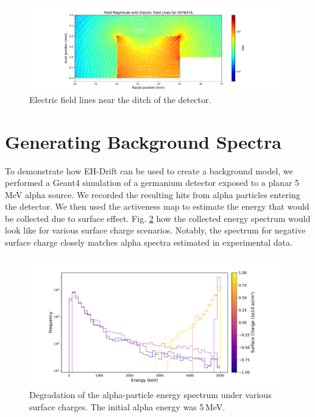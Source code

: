 \begin{figure}
\includegraphics[trim={5cm 0cm 5cm 0cm},clip,width=0.99\linewidth]{ch5/figs/elect_field_lines_surface_V07647A.pdf}
\caption{Electric field lines near the ditch of the detector.}
\label{ch5:fig:elect_field_lines_surface_V07647A}
\end{figure}
\section{\label{res:3} Generating Background Spectra}

To demonstrate how EH-Drift can be used to create a background model, we performed a Geant4 simulation of a germanium detector exposed to a planar 5\,MeV alpha source. We recorded the resulting hits from alpha particles entering the detector. We then used the activeness map to estimate the energy that would be collected due to surface effect. Fig. \ref{fig:eng_spec_degradation} how the collected energy spectrum would look like for various surface charge scenarios. Notably, the spectrum for negative surface charge closely matches alpha spectra estimated in experimental data.

\begin{figure}[!htb]
  \centering

  \includegraphics[trim={2cm 0.5cm 4.5cm 1.7cm},clip,width=0.99\linewidth]{ch5/figs/eng_deg_hist.pdf}
  \caption{Degradation of the alpha-particle energy spectrum under various surface charges. The initial alpha energy was 5\,MeV.}
  \label{fig:eng_spec_degradation}
\end{figure}


